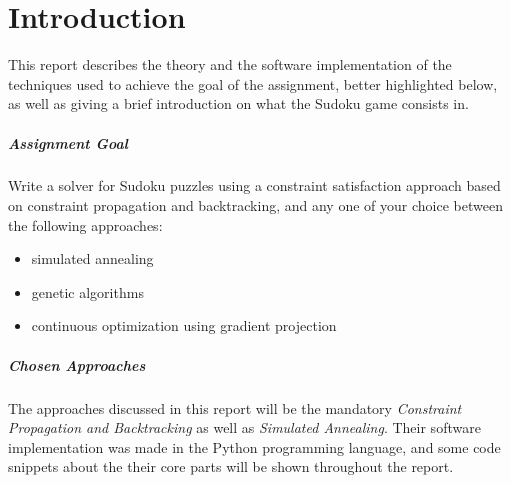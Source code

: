 \chapter{Introduction}

This report describes the theory and the software implementation of the techniques used to achieve the goal of the assignment, better highlighted below, as well as giving a brief introduction on what the Sudoku game consists in.

\paragraph{Assignment Goal} Write a solver for Sudoku puzzles using a constraint satisfaction approach based on constraint propagation and backtracking, and any one of your choice between the following approaches:

\begin{itemize}
    \item simulated annealing
    \item genetic algorithms
    \item continuous optimization using gradient projection
\end{itemize}

\paragraph{Chosen Approaches} The approaches discussed in this report will be the mandatory \textit{Constraint Propagation and Backtracking} as well as \textit{Simulated Annealing}. Their software implementation was made in the Python programming language, and some code snippets about the their core parts will be shown throughout the report.
